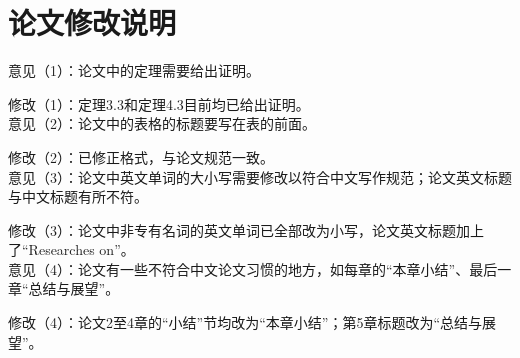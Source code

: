 \chapter{论文修改说明}

意见（1）：论文中的定理需要给出证明。

修改（1）：定理3.3和定理4.3目前均已给出证明。
~\\

意见（2）：论文中的表格的标题要写在表的前面。

修改（2）：已修正格式，与论文规范一致。
~\\

意见（3）：论文中英文单词的大小写需要修改以符合中文写作规范；论文英文标题与中文标题有所不符。

修改（3）：论文中非专有名词的英文单词已全部改为小写，论文英文标题加上了“Researches on”。
~\\

意见（4）：论文有一些不符合中文论文习惯的地方，如每章的“本章小结”、最后一章“总结与展望”。

修改（4）：论文2至4章的“小结”节均改为“本章小结”；第5章标题改为“总结与展望”。
